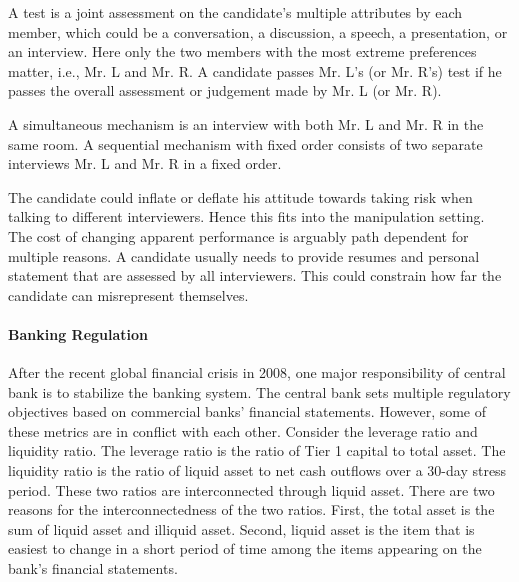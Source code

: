 A test is  a joint assessment on the candidate's multiple attributes by each member, which could be a conversation, a discussion, a speech, a presentation, or an interview.
Here only the two members with the most extreme preferences matter, i.e., Mr. L and Mr. R.
A candidate passes Mr. L's (or Mr. R's) test if he passes the overall assessment or judgement made by Mr. L (or Mr. R). 

 A simultaneous mechanism is an interview with both Mr. L and Mr. R in the same room.
 A sequential mechanism with fixed order consists of  two separate interviews Mr. L and Mr. R in a  fixed order.

The candidate could inflate or deflate his attitude towards taking risk when talking to different interviewers.
Hence this fits into the manipulation setting.
The cost of changing apparent performance is arguably path dependent for multiple reasons.
A candidate usually needs to provide resumes and personal statement that are assessed by all interviewers. This could constrain how far the candidate can misrepresent themselves.

\paragraph{Banking Regulation}
After the recent global financial crisis in 2008, one major responsibility of central bank is to stabilize the banking system. 
The central bank sets multiple regulatory objectives based on commercial banks' financial statements. 
However, some of these metrics are in conflict with each other.
Consider the leverage ratio and liquidity ratio.
The leverage ratio is the ratio of Tier 1 capital to total asset.
The liquidity ratio is the ratio of liquid asset to net cash outflows over a 30-day stress period.
These two ratios are interconnected through liquid asset.
There are two reasons for the interconnectedness of the two ratios.
First, the total asset is the sum of liquid asset and illiquid asset.
Second, liquid asset is the item that is easiest to change in a short period of time among the items appearing on the bank's financial statements.

